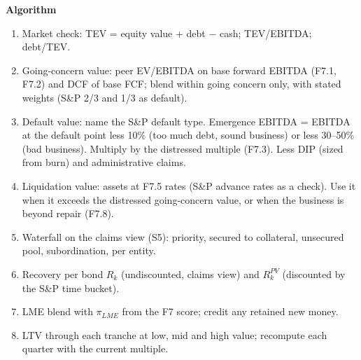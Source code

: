 \documentclass[11pt]{article}
\newcommand{\fld}[1]{\par\medskip\noindent\textbf{\textcolor{steel}{#1}}\par\nopagebreak}
\begin{document}
\fld{Algorithm}
\begin{algobox}
\begin{enumerate}
\item Market check: TEV = equity value + debt $-$ cash; TEV/EBITDA; debt/TEV.
\item Going-concern value: peer EV/EBITDA on base forward EBITDA (F7.1, F7.2) and DCF of base FCF; blend within going concern only, with stated weights (S\&P 2/3 and 1/3 as default).
\item Default value: name the S\&P default type. Emergence EBITDA = EBITDA at the default point less 10\% (too much debt, sound business) or less 30--50\% (bad business). Multiply by the distressed multiple (F7.3). Less DIP (sized from burn) and administrative claims.
\item Liquidation value: assets at F7.5 rates (S\&P advance rates as a check). Use it when it exceeds the distressed going-concern value, or when the business is beyond repair (F7.8).
\item Waterfall on the claims view (S5): priority, secured to collateral, unsecured pool, subordination, per entity.
\item Recovery per bond $R_k$ (undiscounted, claims view) and $R^{PV}_k$ (discounted by the S\&P time bucket).
\item LME blend with $\pi_{LME}$ from the F7 score; credit any retained new money.
\item LTV through each tranche at low, mid and high value; recompute each quarter with the current multiple.
\end{enumerate}
\end{algobox}
\end{document}
